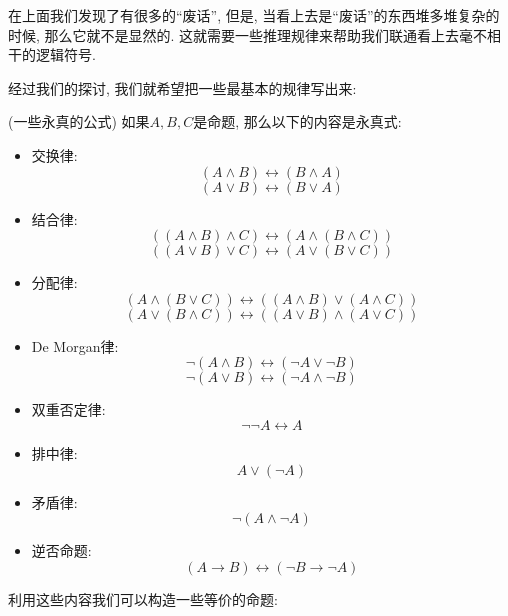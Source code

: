 在上面我们发现了有很多的``废话'', 但是, 当看上去是``废话''的东西堆多堆复杂的时候, 那么它就不是显然的. 这就需要一些推理规律来帮助我们联通看上去毫不相干的逻辑符号. 

经过我们的探讨, 我们就希望把一些最基本的规律写出来: 

\begin{proposition}(一些永真的公式)
如果$A,B,C$是命题, 那么以下的内容是永真式: 
        \begin{itemize}
            
            \item 交换律:
          \[
            (A \land B) \leftrightarrow (B \land A)
          \]
          \[
            (A \lor B) \leftrightarrow (B \lor A)
          \]
        \item 结合律:
          \[
            ((A \land B) \land C) \leftrightarrow (A \land (B \land C))
          \]
          \[
            ((A \lor B) \lor C) \leftrightarrow (A \lor (B \lor C))
          \]
        \item 分配律:
          \[
            (A \land (B \lor C)) \leftrightarrow ((A \land B) \lor (A \land C))
          \]
          \[
            (A \lor (B \land C)) \leftrightarrow ((A \lor B) \land (A \lor C))
          \]
        \item De Morgan律: 
          \[
            \lnot (A \land B) \leftrightarrow (\lnot A \lor \lnot B)
          \]
          \[
            \lnot (A \lor B) \leftrightarrow (\lnot A \land \lnot B)
          \]
          \item 双重否定律:
            \[
                \lnot \lnot A \leftrightarrow A
            \]
            \item 排中律:
            \[
                A \lor (\lnot A)
            \]
            \item 矛盾律:
            \[
                \lnot (A \land \lnot A)
            \]
            \item 逆否命题:
            \[
                (A \to B) \leftrightarrow (\lnot B \to \lnot A)
            \]
        \end{itemize}
        
      \end{proposition}

利用这些内容我们可以构造一些等价的命题: 

